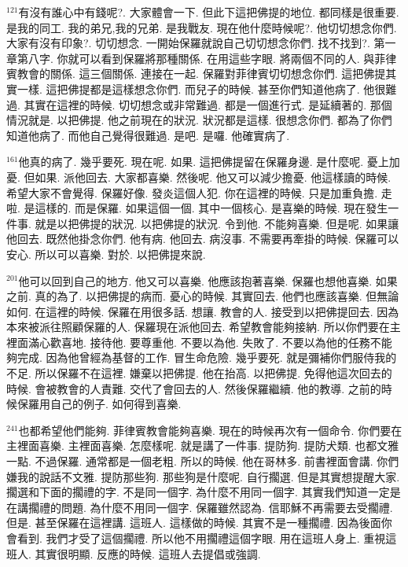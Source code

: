 \documentclass{book}
\begin{document}
$^{121}$有沒有誰心中有錢呢?.
大家體會一下.
但此下這把佛提的地位.
都同樣是很重要.
是我的同工.
我的弟兄,我的兄弟.
是我戰友.
現在他什麼時候呢?.
他切切想念你們.
大家有沒有印象?.
切切想念.
一開始保羅就說自己切切想念你們.
找不找到?.
第一章第八字.
你就可以看到保羅將那種關係.
在用這些字眼.
將兩個不同的人.
與菲律賓教會的關係.
這三個關係.
連接在一起.
保羅對菲律賓切切想念你們.
這把佛提其實一樣.
這把佛提都是這樣想念你們.
而兒子的時候.
甚至你們知道他病了.
他很難過.
其實在這裡的時候.
切切想念或非常難過.
都是一個進行式.
是延續著的.
那個情況就是.
以把佛提.
他之前現在的狀況.
狀況都是這樣.
很想念你們.
都為了你們知道他病了.
而他自己覺得很難過.
是吧.
是囉.
他確實病了.

$^{161}$他真的病了.
幾乎要死.
現在呢.
如果.
這把佛提留在保羅身邊.
是什麼呢.
憂上加憂.
但如果.
派他回去.
大家都喜樂.
然後呢.
他又可以減少擔憂.
他這樣讀的時候.
希望大家不會覺得.
保羅好像.
發炎這個人犯.
你在這裡的時候.
只是加重負擔.
走啦.
是這樣的.
而是保羅.
如果這個一個.
其中一個核心.
是喜樂的時候.
現在發生一件事.
就是以把佛提的狀況.
以把佛提的狀況.
令到他.
不能夠喜樂.
但是呢.
如果讓他回去.
既然他掛念你們.
他有病.
他回去.
病沒事.
不需要再牽掛的時候.
保羅可以安心.
所以可以喜樂.
對於.
以把佛提來說.

$^{201}$他可以回到自己的地方.
他又可以喜樂.
他應該抱著喜樂.
保羅也想他喜樂.
如果之前.
真的為了.
以把佛提的病而.
憂心的時候.
其實回去.
他們也應該喜樂.
但無論如何.
在這裡的時候.
保羅在用很多話.
想讓.
教會的人.
接受到以把佛提回去.
因為本來被派往照顧保羅的人.
保羅現在派他回去.
希望教會能夠接納.
所以你們要在主裡面滿心歡喜地.
接待他.
要尊重他.
不要以為他.
失敗了.
不要以為他的任務不能夠完成.
因為他曾經為基督的工作.
冒生命危險.
幾乎要死.
就是彌補你們服侍我的不足.
所以保羅不在這裡.
嫌棄以把佛提.
他在抬高.
以把佛提.
免得他這次回去的時候.
會被教會的人責難.
交代了會回去的人.
然後保羅繼續.
他的教導.
之前的時候保羅用自己的例子.
如何得到喜樂.

$^{241}$也都希望他們能夠.
菲律賓教會能夠喜樂.
現在的時候再次有一個命令.
你們要在主裡面喜樂.
主裡面喜樂.
怎麼樣呢.
就是講了一件事.
提防狗.
提防犬類.
也都文雅一點.
不過保羅.
通常都是一個老粗.
所以的時候.
他在哥林多.
前書裡面會講.
你們嫌我的說話不文雅.
提防那些狗.
那些狗是什麼呢.
自行擱選.
但是其實想提醒大家.
擱選和下面的擱禮的字.
不是同一個字.
為什麼不用同一個字.
其實我們知道一定是在講擱禮的問題.
為什麼不用同一個字.
保羅雖然認為.
信耶穌不再需要去受擱禮.
但是.
甚至保羅在這裡講.
這班人.
這樣做的時候.
其實不是一種擱禮.
因為後面你會看到.
我們才受了這個擱禮.
所以他不用擱禮這個字眼.
用在這班人身上.
重視這班人.
其實很明顯.
反應的時候.
這班人去提倡或強調.
\end{document}
